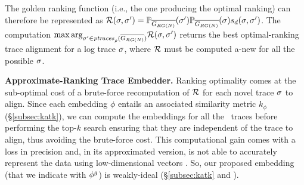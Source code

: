 {The golden ranking function (i.e., the one producing the optimal ranking) can therefore be represented as $\goldenrank(\logtrace,\nonlogtrace)=\probskip{\nonlogtrace} \probskip{\logtrace} s_d(\logtrace,\nonlogtrace)$. The computation ${\max\arg}_{\nonlogtrace\in \WCal{\pmin}{n}} \goldenrank(\logtrace,{\nonlogtrace})$ returns the best optimal-ranking trace alignment for a log trace $\logtrace$, where $\goldenrank$ must be computed a-new for all the possible $\logtrace$.
	
	
\vspace{+0.2cm}	
\noindent
\textbf{Approximate-Ranking Trace Embedder.}\label{subsec:ate}
Ranking optimality comes at the sub-optimal cost of a brute-force recomputation of $\goldenrank$ for each novel trace $\logtrace$ to align.
Since each embedding $\phi$ entails an associated similarity metric $k_\phi$ (\S\ref{subsec:katk}), %
we can compute the embeddings for all the \unravelled\ traces
before performing the top-$k$ search ensuring that they are independent of the trace to align, thus avoiding the brute-force cost. This computational gain comes with a loss in precision %
 \cite{GartnerFW03} and, in its approximated version, is not able to accurately represent the data using low-dimensional vectors \cite{Seshadhri5631}. So, our proposed embedding (that we indicate with $\gorgembed$) is weakly-ideal (\S\ref{subsec:katk} and \cite{Gartner03}).

}
